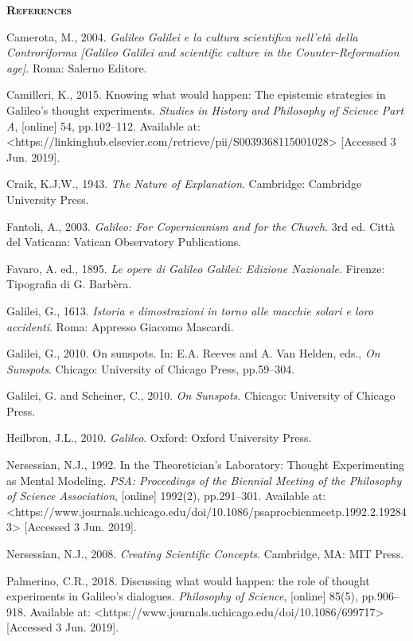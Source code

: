 \begin{artengenv}
{\centering\bfseries\scshape
References
\par}

Camerota, M., 2004. \textit{Galileo Galilei e la cultura scientifica nell’età della Controriforma [Galileo Galilei and
scientific culture in the Counter-Reformation age]}. Roma: Salerno Editore.

Camilleri, K., 2015. Knowing what would happen: The epistemic strategies in Galileo’s thought experiments.
\textit{Studies in History and Philosophy of Science Part A}, [online] 54, pp.102–112. Available at:
{\textless}https://linkinghub.elsevier.com/retrieve/pii/S0039368115001028{\textgreater} [Accessed 3 Jun. 2019].

Craik, K.J.W., 1943. \textit{The Nature of Explanation}. Cambridge: Cambridge University Press.

Fantoli, A., 2003. \textit{Galileo: For Copernicanism and for the Church}. 3rd ed. Città del Vaticana: Vatican
Observatory Publications.

Favaro, A. ed., 1895. \textit{Le opere di Galileo Galilei: Edizione Nazionale}. Firenze: Tipografia di G. Barbèra.

Galilei, G., 1613. \textit{Istoria e dimostrazioni in torno alle macchie solari e loro accidenti}. Roma: Appresso
Giacomo Mascardi.

Galilei, G., 2010. On sunspots. In: E.A. Reeves and A. Van Helden, eds., \textit{On Sunspots}. Chicago: University of
Chicago Press, pp.59–304.

Galilei, G. and Scheiner, C., 2010. \textit{On Sunspots}. Chicago: University of Chicago Press.

Heilbron, J.L., 2010. \textit{Galileo}. Oxford: Oxford University Press.

Nersessian, N.J., 1992. In the Theoretician’s Laboratory: Thought Experimenting as Mental Modeling. \textit{PSA:
Proceedings of the Biennial Meeting of the Philosophy of Science Association}, [online] 1992(2), pp.291–301. Available
at: {\textless}https://www.journals.uchicago.edu/doi/10.1086/psaprocbienmeetp.1992.2.192843{\textgreater} [Accessed 3
Jun. 2019].

Nersessian, N.J., 2008. \textit{Creating Scientific Concepts}. Cambridge, MA: MIT Press.

Palmerino, C.R., 2018. Discussing what would happen: the role of thought experiments in Galileo’s dialogues.
\textit{Philosophy of Science}, [online] 85(5), pp.906–918. Available at:
{\textless}https://www.journals.uchicago.edu/doi/10.1086/699717{\textgreater} [Accessed 3 Jun. 2019].


\end{artengenv}
